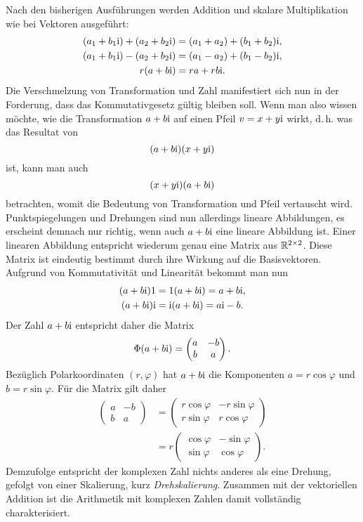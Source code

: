 Nach den bisherigen Ausführungen werden Addition und skalare
Multiplikation wie bei Vektoren ausgeführt:
\begin{gather*}
(a_1+b_1\mathrm{i}) + (a_2+b_2\mathrm{i}) = (a_1+a_2)+(b_1+b_2)\mathrm{i},\\
(a_1+b_1\mathrm{i}) - (a_2+b_2\mathrm{i}) = (a_1-a_2)+(b_1-b_2)\mathrm{i},\\
r(a+b\mathrm{i}) = ra+rb\mathrm{i}.
\end{gather*}
Die Verschmelzung von Transformation und Zahl manifestiert sich nun
in der Forderung, dass das Kommutativgesetz gültig bleiben soll.
Wenn man also wissen möchte, wie die Transformation
$a+b\mathrm{i}$ auf einen Pfeil $v=x+y\mathrm{i}$ wirkt, d.\,h. was das Resultat
von
\[(a+b\mathrm{i})(x+y\mathrm{i})\]
ist, kann man auch
\[(x+y\mathrm{i})(a+b\mathrm{i})\]
betrachten, womit die Bedeutung von Transformation und Pfeil
vertauscht wird. Punktspiegelungen und Drehungen sind nun
allerdings lineare Abbildungen, es erscheint demnach nur richtig,
wenn auch $a+b\mathrm{i}$ eine lineare Abbildung ist. Einer linearen
Abbildung entspricht wiederum genau eine Matrix aus $\mathbb R^{2\times 2}$.
Diese Matrix ist eindeutig bestimmt durch ihre Wirkung auf die
Basisvektoren. Aufgrund von Kommutativität und Linearität bekommt
man nun
\begin{gather}
(a+b\mathrm{i})1 = 1(a+b\mathrm{i}) = a+b\mathrm{i},\\
(a+b\mathrm{i})\mathrm{i} = \mathrm{i}(a+b\mathrm{i}) = a\mathrm{i}-b.
\end{gather}
Der Zahl $a+b\mathrm{i}$ entspricht daher die Matrix
\begin{equation}
\Phi(a+b\mathrm{i}) = \begin{pmatrix}a & -b\\ b & a\end{pmatrix}.
\end{equation}
Bezüglich Polarkoordinaten $(r,\varphi)$ hat $a+b\mathrm{i}$
die Komponenten $a=r\cos\varphi$ und $b=r\sin\varphi$.
Für die Matrix gilt daher%
\begin{align}
\begin{pmatrix}a & -b\\ b & a\end{pmatrix}
&= \begin{pmatrix}
r\cos\varphi & -r\sin\varphi\\
r\sin\varphi & r\cos\varphi
\end{pmatrix}\\
&= r\begin{pmatrix}
\cos\varphi & -\sin\varphi\\
\sin\varphi & \cos\varphi
\end{pmatrix}.
\end{align}
Demzufolge entspricht der komplexen Zahl nichts anderes als eine
Drehung, gefolgt von einer Skalierung, kurz \emph{Drehskalierung}.
Zusammen mit der vektoriellen Addition ist die Arithmetik mit komplexen
Zahlen damit vollständig charakterisiert.



